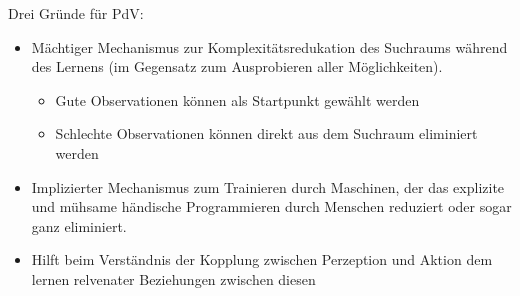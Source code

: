 \documentclass[paper=a4, fontsize=11pt]{scrartcl} %
\numberwithin{equation}{section} %
\numberwithin{figure}{section} %
\numberwithin{table}{section} %
\begin{document}
Drei Gründe für PdV:
\begin{itemize}
\item Mächtiger Mechanismus zur Komplexitätsredukation des Suchraums während des Lernens (im Gegensatz zum Ausprobieren aller Möglichkeiten).
\begin{itemize}
\item Gute Observationen können als Startpunkt gewählt werden
\item Schlechte Observationen können direkt aus dem Suchraum eliminiert werden
\end{itemize}
\item Implizierter Mechanismus zum Trainieren durch Maschinen, der das explizite und mühsame händische Programmieren durch Menschen reduziert oder sogar ganz eliminiert.
\item Hilft beim Verständnis der Kopplung zwischen Perzeption und Aktion dem lernen relvenater Beziehungen zwischen diesen
\end{itemize}
\end{document}
